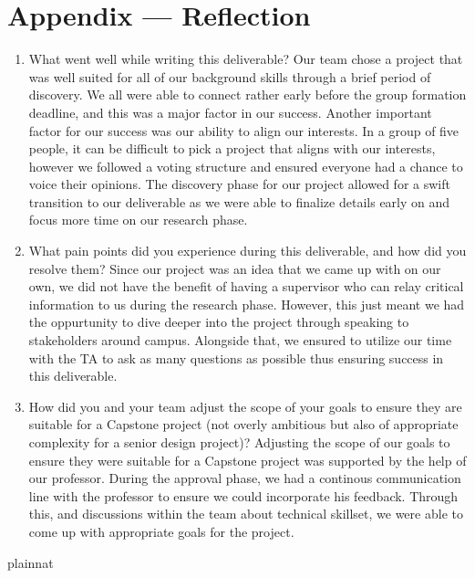 \documentclass{article}
\begin{document}
\newpage{}

\section*{Appendix --- Reflection}




\begin{enumerate}
    \item What went well while writing this deliverable? 
    Our team chose a project that was well suited for all of our background skills 
    through a brief period of discovery. We all were able to connect rather early before
    the group formation deadline, and this was a major factor in our success. Another important
    factor for our success was our ability to align our interests. In a group of five people, it
    can be difficult to pick a project that aligns with our interests, however we followed a voting 
    structure and ensured everyone had a chance to voice their opinions. The discovery phase for our 
    project allowed for a swift transition to our deliverable as we were able to finalize details early 
    on and focus more time on our research phase.
    \item What pain points did you experience during this deliverable, and how
    did you resolve them?
    Since our project was an idea that we came up with on our own, we did not have the benefit of having a supervisor 
    who can relay critical information to us during the research phase. However, this just meant we had the oppurtunity
    to dive deeper into the project through speaking to stakeholders around campus. Alongside that, we ensured to utilize our time 
    with the TA to ask as many questions as possible thus ensuring success in this deliverable.
    \item How did you and your team adjust the scope of your goals to ensure
    they are suitable for a Capstone project (not overly ambitious but also of
    appropriate complexity for a senior design project)?
    Adjusting the scope of our goals to ensure they were suitable for a Capstone project was supported by the help of our professor. During 
    the approval phase, we had a continous communication line with the professor to ensure we could incorporate his feedback. Through this, 
    and discussions within the team about technical skillset, we were able to come up with appropriate goals for the project.
    
\end{enumerate}  

 {plainnat}

\end{document}
